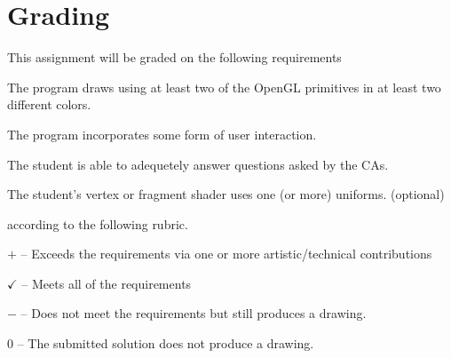 \documentclass{article}
\begin{document}
\section*{Grading}
This assignment will be graded on the following requirements
\begin{itemize*}
\item The program draws using at least two of the OpenGL primitives in at least two different colors.
\item The program incorporates some form of user interaction.
\item The student is able to adequetely answer questions asked by the CAs.
\item The student's vertex or fragment shader uses one (or more) uniforms. (optional)
\end{itemize*}
according to the following rubric.
\begin{itemize*}
\item $+$ -- Exceeds the requirements via one or more artistic/technical contributions
\item $\checkmark$ -- Meets all of the requirements
\item $-$ -- Does not meet the requirements but still produces a drawing.
\item $0$ -- The submitted solution does not produce a drawing.
\end{itemize*}
\end{document}
